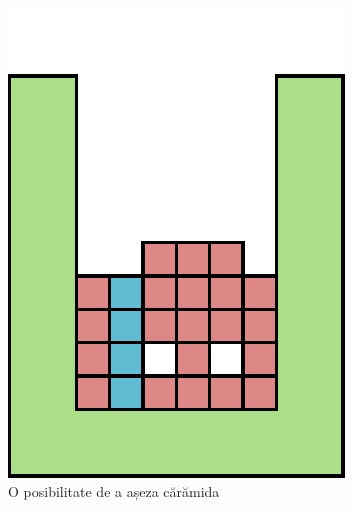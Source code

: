 \documentclass[12pt]{article}
\begin{document}
\begin{figure}[h!]
\begin{subfigure}[t]{0.23\textwidth}
    \label{fig:threelinesA}
  \end{subfigure}%
  ~ %
  \begin{subfigure}[t]{0.23\textwidth}
    \includegraphics[width=\textwidth]{graphics/threelinesB.pdf}
    \caption{O posibilitate de a așeza cărămida}
    \label{fig:threelinesB}
  \end{subfigure}%
  ~ %
  \begin{subfigure}[t]{0.23\textwidth}

\end{subfigure}
\end{figure}
\end{document}
